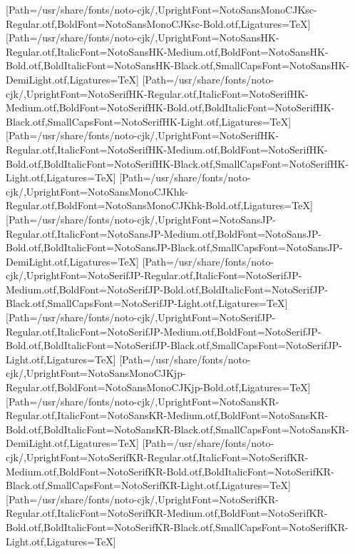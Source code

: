 \newfontfamily{}[Path=/usr/share/fonts/noto-cjk/,UprightFont=NotoSansMonoCJKsc-Regular.otf,BoldFont=NotoSansMonoCJKsc-Bold.otf,Ligatures=TeX]
\newfontfamily{}[Path=/usr/share/fonts/noto-cjk/,UprightFont=NotoSansHK-Regular.otf,ItalicFont=NotoSansHK-Medium.otf,BoldFont=NotoSansHK-Bold.otf,BoldItalicFont=NotoSansHK-Black.otf,SmallCapsFont=NotoSansHK-DemiLight.otf,Ligatures=TeX]
\newfontfamily{}[Path=/usr/share/fonts/noto-cjk/,UprightFont=NotoSerifHK-Regular.otf,ItalicFont=NotoSerifHK-Medium.otf,BoldFont=NotoSerifHK-Bold.otf,BoldItalicFont=NotoSerifHK-Black.otf,SmallCapsFont=NotoSerifHK-Light.otf,Ligatures=TeX]
\newfontfamily{}[Path=/usr/share/fonts/noto-cjk/,UprightFont=NotoSerifHK-Regular.otf,ItalicFont=NotoSerifHK-Medium.otf,BoldFont=NotoSerifHK-Bold.otf,BoldItalicFont=NotoSerifHK-Black.otf,SmallCapsFont=NotoSerifHK-Light.otf,Ligatures=TeX]
\newfontfamily{}[Path=/usr/share/fonts/noto-cjk/,UprightFont=NotoSansMonoCJKhk-Regular.otf,BoldFont=NotoSansMonoCJKhk-Bold.otf,Ligatures=TeX]
\newfontfamily{}[Path=/usr/share/fonts/noto-cjk/,UprightFont=NotoSansJP-Regular.otf,ItalicFont=NotoSansJP-Medium.otf,BoldFont=NotoSansJP-Bold.otf,BoldItalicFont=NotoSansJP-Black.otf,SmallCapsFont=NotoSansJP-DemiLight.otf,Ligatures=TeX]
\newfontfamily{}[Path=/usr/share/fonts/noto-cjk/,UprightFont=NotoSerifJP-Regular.otf,ItalicFont=NotoSerifJP-Medium.otf,BoldFont=NotoSerifJP-Bold.otf,BoldItalicFont=NotoSerifJP-Black.otf,SmallCapsFont=NotoSerifJP-Light.otf,Ligatures=TeX]
\newfontfamily{}[Path=/usr/share/fonts/noto-cjk/,UprightFont=NotoSerifJP-Regular.otf,ItalicFont=NotoSerifJP-Medium.otf,BoldFont=NotoSerifJP-Bold.otf,BoldItalicFont=NotoSerifJP-Black.otf,SmallCapsFont=NotoSerifJP-Light.otf,Ligatures=TeX]
\newfontfamily{}[Path=/usr/share/fonts/noto-cjk/,UprightFont=NotoSansMonoCJKjp-Regular.otf,BoldFont=NotoSansMonoCJKjp-Bold.otf,Ligatures=TeX]
\newfontfamily{}[Path=/usr/share/fonts/noto-cjk/,UprightFont=NotoSansKR-Regular.otf,ItalicFont=NotoSansKR-Medium.otf,BoldFont=NotoSansKR-Bold.otf,BoldItalicFont=NotoSansKR-Black.otf,SmallCapsFont=NotoSansKR-DemiLight.otf,Ligatures=TeX]
\newfontfamily{}[Path=/usr/share/fonts/noto-cjk/,UprightFont=NotoSerifKR-Regular.otf,ItalicFont=NotoSerifKR-Medium.otf,BoldFont=NotoSerifKR-Bold.otf,BoldItalicFont=NotoSerifKR-Black.otf,SmallCapsFont=NotoSerifKR-Light.otf,Ligatures=TeX]
\newfontfamily{}[Path=/usr/share/fonts/noto-cjk/,UprightFont=NotoSerifKR-Regular.otf,ItalicFont=NotoSerifKR-Medium.otf,BoldFont=NotoSerifKR-Bold.otf,BoldItalicFont=NotoSerifKR-Black.otf,SmallCapsFont=NotoSerifKR-Light.otf,Ligatures=TeX]
